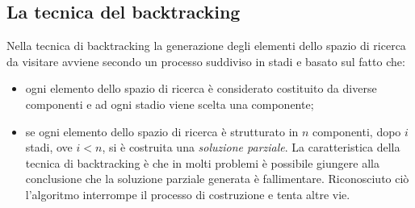 \documentclass[12pt]{report}
\begin{document}
 	\subsection{La tecnica del backtracking}
 	Nella tecnica di backtracking la generazione degli elementi dello spazio di ricerca da visitare avviene secondo un processo suddiviso in stadi e basato sul fatto che:
 	\begin{itemize}
 		\item ogni elemento dello spazio di ricerca è considerato costituito da diverse componenti e ad ogni stadio viene scelta una componente;
 		\item se ogni elemento dello spazio di ricerca è strutturato in $n$ componenti, dopo $i$ stadi, ove $i < n$, si è costruita una \textit{soluzione parziale}. La caratteristica della tecnica di backtracking è che in molti problemi è possibile giungere alla conclusione che la soluzione parziale generata è fallimentare. Riconosciuto ciò l'algoritmo interrompe il processo di costruzione e tenta altre vie.
 	\end{itemize}
\end{document}
